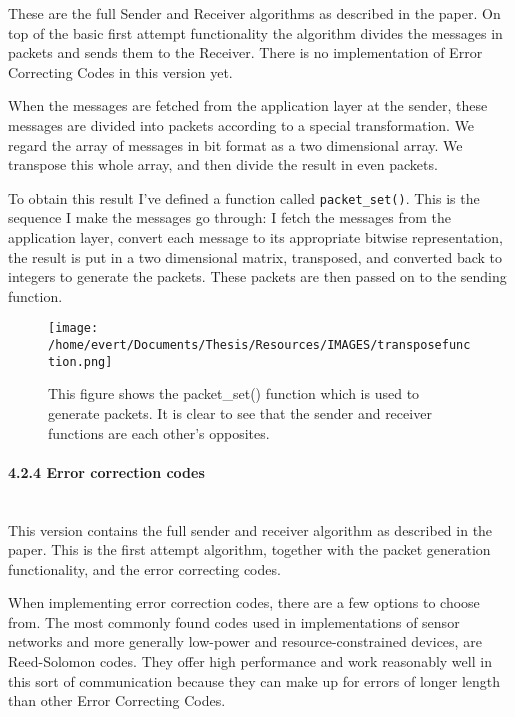 These are the full Sender and Receiver algorithms as described in the
paper. On top of the basic first attempt functionality the algorithm
divides the messages in packets and sends them to the Receiver. There is
no implementation of Error Correcting Codes in this version yet.

When the messages are fetched from the application layer at the sender,
these messages are divided into packets according to a special
transformation. We regard the array of messages in bit format as a two
dimensional array. We transpose this whole array, and then divide the
result in even packets.

To obtain this result I've defined a function called
\texttt{packet\_set()}. This is the sequence I make the messages go
through: I fetch the messages from the application layer, convert each
message to its appropriate bitwise representation, the result is put in
a two dimensional matrix, transposed, and converted back to integers to
generate the packets. These packets are then passed on to the sending
function.

\begin{figure}[htbp]
\centering
\texttt{[image: /home/evert/Documents/Thesis/Resources/IMAGES/transposefunction.png]}
\caption{This figure shows the packet\_set() function which is used to
generate packets. It is clear to see that the sender and receiver
functions are each other's opposites.}
\end{figure}

\paragraph{4.2.4 Error correction
codes\\\\}\label{error-correction-codes}

This version contains the full sender and receiver algorithm as
described in the paper. This is the first attempt algorithm, together
with the packet generation functionality, and the error correcting
codes.

When implementing error correction codes, there are a few options to
choose from. The most commonly found codes used in implementations of
sensor networks and more generally low-power and resource-constrained
devices, are Reed-Solomon codes. They offer high performance and work
reasonably well in this sort of communication because they can make up
for errors of longer length than other Error Correcting
Codes\cite{wicker1999reed}\cite{qazi2014performance}.

